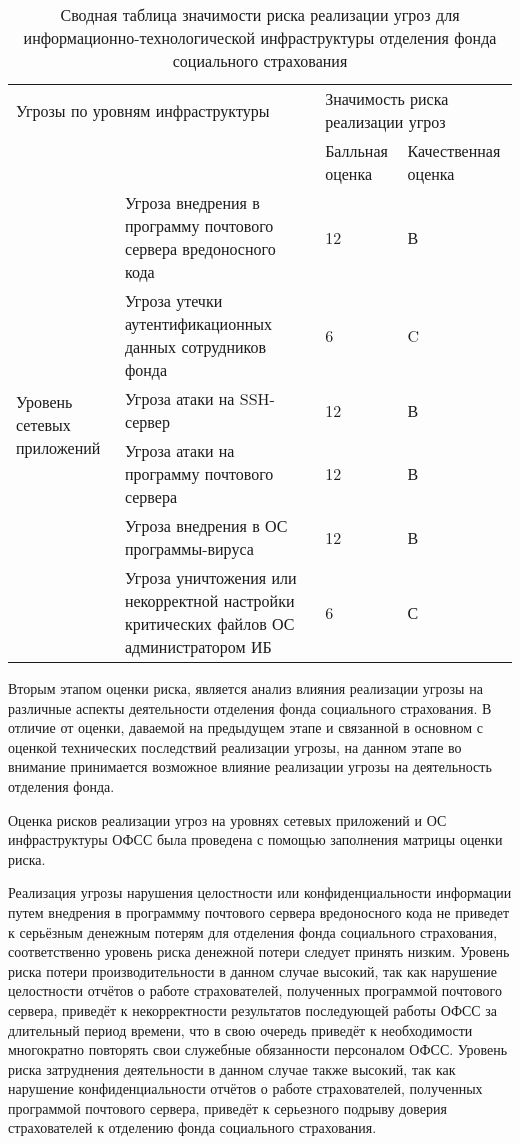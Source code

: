 \begin{table}[h]
  \caption{Сводная таблица значимости риска реализации угроз для информационно-технологической инфраструктуры отделения фонда социального страхования}
  \label{tab:res_risk}
\small
  \begin{tabular}{|p{2.5cm}|p{7cm}|p{2cm}|p{2cm}|}
    \hline
    \multicolumn{2}{|p{9.5cm}}{Угрозы по уровням инфраструктуры} &
    \multicolumn{2}{|p{5cm}|}{Значимость риска реализации угроз}\\\cline{3-4}
    \multicolumn{2}{|p{9.5cm}|}{} & Балльная оценка & Качественная оценка\\\hline
    \multirow{7}{2.5cm}{Уровень сетевых приложений} & Угроза внедрения в программу почтового сервера вредоносного
    кода & 12 & В \\\cline{2-4}
    & Угроза утечки аутентификационных данных сотрудников фонда & 6 &
    C \\\cline{2-4}
    & Угроза атаки на SSH-сервер & 12 & В \\\cline{2-4}
    & Угроза атаки на программу почтового сервера & 12 & В
    \\\hline
    \multirow{5}{2.5cm}{Уровень операционных систем} & Угроза
    внедрения в ОС программы-вируса & 12 & В \\\cline{2-4}
    & Угроза уничтожения или некорректной настройки критических файлов
  ОС администратором ИБ & 6 & С \\\hline
  \end{tabular}
\end{table}
\normalsize

\point Вторым этапом оценки риска, является анализ влияния реализации
угрозы на различные аспекты деятельности отделения фонда социального
страхования.  В отличие от оценки, даваемой на предыдущем этапе и
связанной в основном с оценкой технических последствий реализации
угрозы, на данном этапе во внимание принимается возможное влияние
реализации угрозы на деятельность отделения фонда.

\point Оценка рисков реализации угроз на уровнях сетевых приложений и
ОС инфраструктуры ОФСС была проведена с помощью заполнения матрицы
оценки риска.

\point Реализация угрозы нарушения целостности или конфиденциальности
информации путем внедрения в программму почтового сервера вредоносного
кода не приведет к серьёзным денежным потерям для отделения фонда
социального страхования, соответственно уровень риска денежной потери
следует принять низким. Уровень риска потери производительности в
данном случае высокий, так как нарушение целостности отчётов о работе
страхователей, полученных программой почтового сервера, приведёт к
некорректности результатов последующей работы ОФСС за длительный
период времени, что в свою очередь приведёт к необходимости
многократно повторять свои служебные обязанности персоналом
ОФСС. Уровень риска затруднения деятельности в данном случае также
высокий, так как нарушение конфиденциальности отчётов о работе
страхователей, полученных программой почтового сервера, приведёт к
серьезного подрыву доверия страхователей к отделению фонда социального
страхования.

